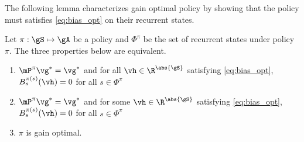 The following lemma characterizes gain optimal policy by showing that the policy must satisfies \eqref{eq:bias_opt} on their recurrent states.
\begin{lem}
    \label{lem:opt_pol}
    Let $\pi:\gS\mapsto\gA$ be a policy and $\Phi^\pi$ be the set of recurrent states under policy $\pi$.
    The three properties below are equivalent.
    \begin{enumerate}[label=(\roman*)]
        \item \label{it:opt_pol1} $\mP^\pi\vg^*=\vg^*$ and for all $\vh\in \R^{\abs{\gS}}$ satisfying \eqref{eq:bias_opt}, $B^{\pi(s)}_s(\vh)=0$ for all $s\in\Phi^\pi$
        \item \label{it:opt_pol2} $\mP^\pi\vg^*=\vg^*$ and for some $\vh\in \R^{\abs{\gS}}$ satisfying \eqref{eq:bias_opt}, $B^{\pi(s)}_s(\vh)=0$ for all $s\in\Phi^\pi$
        \item \label{it:opt_pol3} $\pi$ is gain optimal.
    \end{enumerate}
\end{lem}

